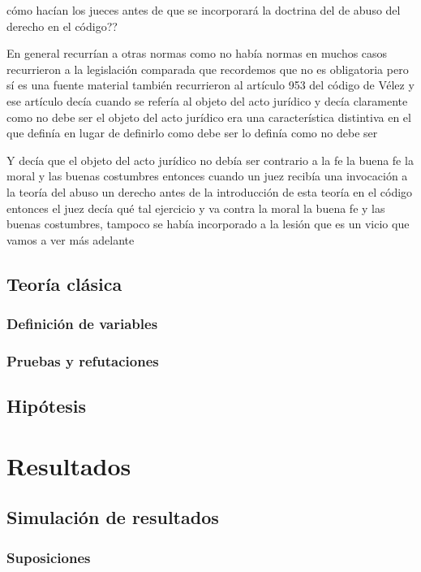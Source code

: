 \documentclass[12pt]{book}
\begin{document}
cómo hacían los jueces antes de que se incorporará la doctrina del de abuso del derecho en el código??

En general recurrían a otras normas como no había normas en muchos casos recurrieron a la legislación comparada que recordemos que no es obligatoria pero sí es una fuente material también recurrieron al artículo 953 del código de Vélez y ese artículo decía cuando se refería al objeto del acto jurídico y decía claramente como no debe ser el objeto del acto jurídico era una característica distintiva en el que definía en lugar de definirlo como debe ser lo definía como no debe ser

Y decía que el objeto del acto jurídico no debía ser contrario a la fe la buena fe la moral y las buenas costumbres entonces cuando un juez recibía una invocación a la teoría del abuso un derecho antes de la introducción de esta teoría en el código entonces el juez decía qué tal ejercicio y va contra la moral la buena fe y las buenas costumbres, tampoco se había incorporado a la lesión que es un vicio que vamos a ver más adelante









\section{Teoría clásica}
\subsection{Definición de variables}
\subsection{Pruebas y refutaciones}
\section{Hipótesis}
\chapter{Resultados}
\section{Simulación de resultados}
\subsection{Suposiciones}
\end{document}
